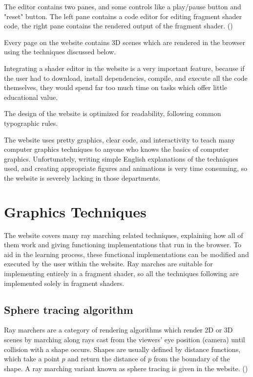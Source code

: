 \documentclass[parskip=half]{scrartcl}
\begin{document}
The editor contains two panes, and some controls like a play/pause button and
"reset" button. The left pane contains a code editor for editing fragment
shader code, the right pane contains the rendered output of the fragment
shader. ()

Every page on the website contains 3D scenes which are rendered in the browser
using the techniques discussed below.

Integrating a shader editor in the website is a very important feature, because
if the user had to download, install dependencies, compile, and execute all the
code themselves, they would spend far too much time on tasks which offer little
educational value.

The design of the website is optimized for readability, following common
typographic rules.

The website uses pretty graphics, clear code, and interactivity to teach many
computer graphics techniques to anyone who knows the basics of computer
graphics. Unfortunately, writing simple English explanations of the techniques
used, and creating appropriate figures and animations is very time consuming,
so the website is severely lacking in those departments.

\section{Graphics Techniques}

The website covers many ray marching related techniques, explaining how all of
them work and giving functioning implementations that run in the browser. To
aid in the learning process, these functional implementations can be modified
and executed by the user within the website. Ray marches are suitable for
implementing entirely in a fragment shader, so all the techniques following are
implemented solely in fragment shaders.

\subsection{Sphere tracing algorithm}

Ray marchers are a category of rendering algorithms which render 2D or 3D
scenes by marching along rays cast from the viewers' eye position (camera)
until collision with a shape occurs. Shapes are usually defined by distance
functions, which take a point $p$ and return the distance of $p$ from the
boundary of the shape. A ray marching variant known as sphere tracing is given
in the website. ()
\end{document}
